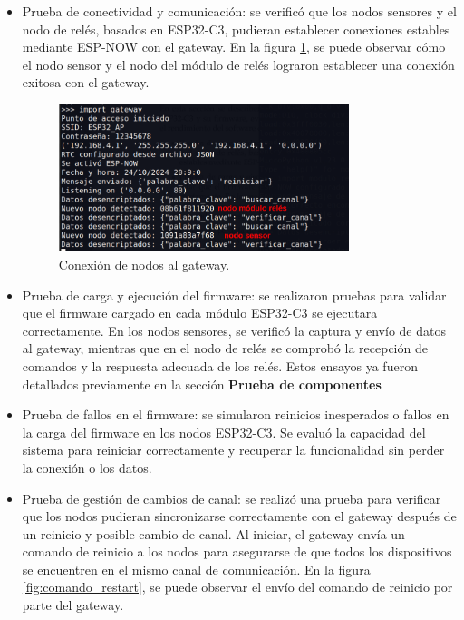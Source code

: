 \begin{itemize}
    \item Prueba de conectividad y comunicación: se verificó que los nodos sensores y el nodo de relés, basados en ESP32-C3, pudieran establecer conexiones estables mediante ESP-NOW con el gateway. En la figura \ref{fig:con_sen_get}, se puede observar cómo el nodo sensor y el nodo del módulo de relés lograron establecer una conexión exitosa con el gateway.
    
\begin{figure}[H]
\centering 
\includegraphics[width=0.8\textwidth]{./Figures/conexion_s_g.png}
\caption{Conexión de nodos al gateway.}
\label{fig:con_sen_get}
\end{figure}
    
    \item Prueba de carga y ejecución del firmware: se realizaron pruebas para validar que el firmware cargado en cada módulo ESP32-C3 se ejecutara correctamente. En los nodos sensores, se verificó la captura y envío de datos al gateway, mientras que en el nodo de relés se comprobó la recepción de comandos y la respuesta adecuada de los relés. Estos ensayos ya fueron detallados previamente en la sección \textbf{Prueba de componentes}
    
    \item Prueba de fallos en el firmware: se simularon reinicios inesperados o fallos en la carga del firmware en los nodos ESP32-C3. Se evaluó la capacidad del sistema para reiniciar correctamente y recuperar la funcionalidad sin perder la conexión o los datos.
    
    \item Prueba de gestión de cambios de canal: se realizó una prueba para verificar que los nodos pudieran sincronizarse correctamente con el gateway después de un reinicio y posible cambio de canal. Al iniciar, el gateway envía un comando de reinicio a los nodos para asegurarse de que todos los dispositivos se encuentren en el mismo canal de comunicación. En la figura \ref{fig:comando_restart}, se puede observar el envío del comando de reinicio por parte del gateway.
   	

\end{itemize}

